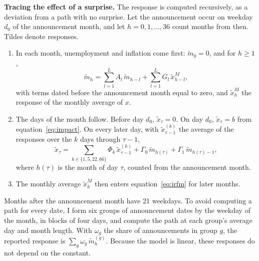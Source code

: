 \documentclass[11pt]{article}
\begin{document}
\begin{appendices}
\textbf{Tracing the effect of a surprise.} The response is computed recursively, as a deviation from a path with no surprise. Let the announcement occur on weekday $d_0$ of the announcement month, and let $h=0,1,\ldots,36$ count months from then. Tildes denote responses.
\begin{enumerate}
\item In each month, unemployment and inflation come first: $\tilde m_0=0$, and for $h\geq 1$,
\begin{equation}
\tilde m_h = \sum_{l=1}^{L} A_l\, \tilde m_{h-l} + \sum_{l=1}^{L} G_l\, \tilde x^{M}_{h-l}, \label{eq:irfm}
\end{equation}
with terms dated before the announcement month equal to zero, and $\tilde x^{M}_{h}$ the response of the monthly average of $x$.
\item The days of the month follow. Before day $d_0$, $\tilde x_\tau=0$. On day $d_0$, $\tilde x_\tau=b$ from equation~\eqref{eq:impact}. On every later day, with $\tilde x^{(k)}_{\tau-1}$ the average of the responses over the $k$ days through $\tau-1$,
\begin{equation}
\tilde x_\tau = \sum_{k\in\{1,5,22,66\}} \Phi_{k}\, \tilde x_{\tau-1}^{(k)} + \Gamma_0\, \tilde m_{h(\tau)} + \Gamma_1\, \tilde m_{h(\tau)-1}, \label{eq:irfd}
\end{equation}
where $h(\tau)$ is the month of day $\tau$, counted from the announcement month.
\item The monthly average $\tilde x^{M}_h$ then enters equation~\eqref{eq:irfm} for later months.
\end{enumerate}
Months after the announcement month have 21 weekdays. To avoid computing a path for every date, I form six groups of announcement dates by the weekday of the month, in blocks of four days, and compute the path at each group's average day and month length. With $\omega_g$ the share of announcements in group $g$, the reported response is $\sum_g \omega_g\, \tilde m_h^{(g)}$. Because the model is linear, these responses do not depend on the constant.


\end{appendices}
\end{document}
